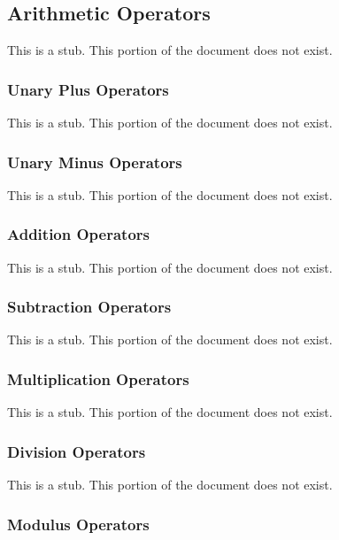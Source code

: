 \subsection{Arithmetic Operators}
\label{Arithmetic_Operators}

This is a stub.  This portion of the document does not exist.

\subsubsection{Unary Plus Operators}
\label{Unary_Plus_Operators}

This is a stub.  This portion of the document does not exist.

\subsubsection{Unary Minus Operators}
\label{Unary_Minus_Operators}

This is a stub.  This portion of the document does not exist.

\subsubsection{Addition Operators}
\label{Addition_Operators}

This is a stub.  This portion of the document does not exist.

\subsubsection{Subtraction Operators}
\label{Subtraction_Operators}

This is a stub.  This portion of the document does not exist.

\subsubsection{Multiplication Operators}
\label{Multiplication_Operators}

This is a stub.  This portion of the document does not exist.

\subsubsection{Division Operators}
\label{Division_Operators}

This is a stub.  This portion of the document does not exist.

\subsubsection{Modulus Operators}
\label{Modulus_Operators}

